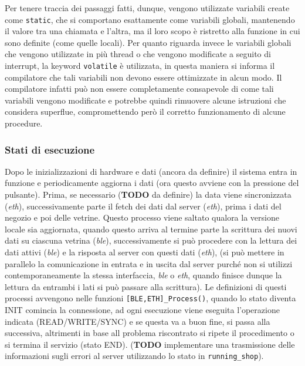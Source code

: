 Per tenere traccia dei passaggi fatti, dunque, vengono utilizzate variabili create come \texttt{static}, che si comportano esattamente come variabili globali, mantenendo il valore tra una chiamata e l'altra, ma il loro scopo \`e ristretto alla funzione in cui sono definite (come quelle locali). Per quanto riguarda invece le variabili globali che vengono utilizzate in pi\`u thread o che vengono modificate a seguito di interrupt, la keyword \texttt{volatile} \`e utilizzata, in questa maniera si informa il compilatore che tali variabili non devono essere ottimizzate in alcun modo. Il compilatore infatti pu\`o non essere completamente consapevole di come tali variabili vengono modificate e potrebbe quindi rimuovere alcune istruzioni che considera superflue, compromettendo per\`o il corretto funzionamento di alcune procedure.

\subsubsection{Stati di esecuzione}


Dopo le inizializzazioni di hardware e dati (ancora da definire) il sistema entra in funzione e periodicamente aggiorna i dati (ora questo avviene con la pressione del pulsante). Prima, se necessario (\textbf{TODO} da definire) la data viene sincronizzata (\textit{eth}), successivamente parte il fetch dei dati dal server (\textit{eth}), prima i dati del negozio e poi delle vetrine. Questo processo viene saltato qualora la versione locale sia aggiornata, quando questo arriva al termine parte la scrittura dei nuovi dati su ciascuna vetrina (\textit{ble}), successivamente si pu\`o procedere con la lettura dei dati attivi (\textit{ble}) e la risposta al server con questi dati (\textit{eth}), (si pu\`o mettere in parallelo la comunicazione in entrata e in uscita dal server purch\'e non si utilizzi contemporaneamente la stessa interfaccia, \textit{ble} o \textit{eth}, quando finisce dunque la lettura da entrambi i lati si pu\`o passare alla scrittura). Le definizioni di questi processi avvengono nelle funzioni \texttt{[BLE,ETH]\_Process()}, quando lo stato diventa INIT comincia la connessione, ad ogni esecuzione viene eseguita l'operazione indicata (READ/WRITE/SYNC) e se questa va a buon fine, si passa alla successiva, altrimenti in base all problema riscontrato si ripete il procedimento o si termina il servizio (stato END). (\textbf{TODO} implementare una trasmissione delle informazioni sugli errori al server utilizzando lo stato in \texttt{running\_shop}).

